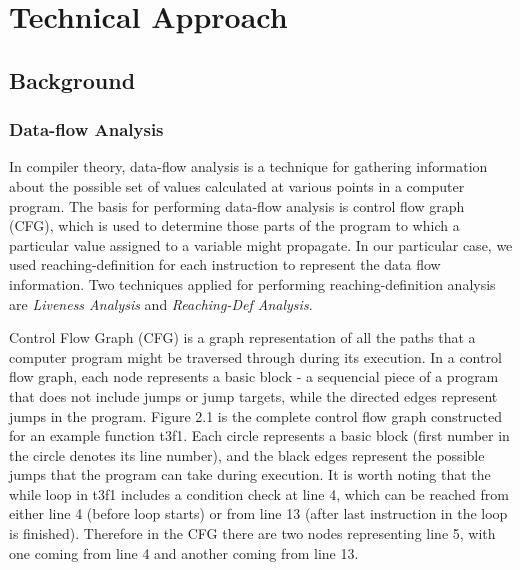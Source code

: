\chapter{Technical Approach}

\section{Background}
\subsection{Data-flow Analysis}
In compiler theory, data-flow analysis is a technique for gathering information about the possible set of values calculated at various points in a computer program. The basis for performing data-flow analysis is control flow graph (CFG), which is used to determine those parts of the program to which a particular value assigned to a variable might propagate. In our particular case, we used reaching-definition for each instruction to represent the data flow information. Two techniques applied for performing reaching-definition analysis are \textit{Liveness Analysis} and \textit{Reaching-Def Analysis}.

Control Flow Graph (CFG) is a graph representation of all the paths that a computer program might be traversed through during its execution. In a control flow graph, each node represents a basic block - a sequencial piece of a program that does not include jumps or jump targets, while the directed edges represent jumps in the program. Figure 2.1 is the complete control flow graph constructed for an example function t3f1. Each circle represents a basic block (first number in the circle denotes its line number), and the black edges represent the possible jumps that the program can take during execution. It is worth noting that the while loop in t3f1 includes a condition check at line 4, which can be reached from either line 4 (before loop starts) or from line 13 (after last instruction in the loop is finished). Therefore in the CFG there are two nodes representing line 5, with one coming from line 4 and another coming from line 13.

